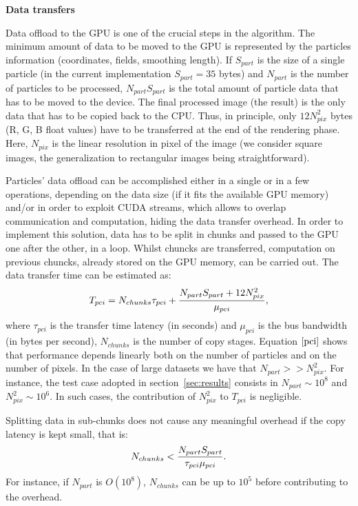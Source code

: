 \documentclass[11pt]{article}
\begin{document}
\medskip
\noindent
{\bf Data transfers}

Data offload to the GPU is one of the crucial steps in the algorithm. 
The minimum amount of data 
to be moved to the GPU is represented by the particles information 
(coordinates, fields, smoothing length). If $S_{part}$ is the
size of a single particle (in the current implementation $S_{part}=35$ bytes) and 
$N_{part}$ is the number of particles to be processed,
$N_{part} S_{part}$ is the total amount of particle data that has to be moved to the device.
The final processed image (the result) is the only data that has to be copied back to
the CPU. Thus, in principle, only $12 N_{pix}^2$ bytes (R, G, B float values) have to be transferred at
the end of the rendering phase. Here, $N_{pix}$ is the linear resolution in pixel of the 
image (we consider square images, the generalization to rectangular images being
straightforward). 

Particles' data offload can be accomplished either in a single or in a few operations, 
depending on the data size (if it fits the available GPU memory) and/or
in order to exploit CUDA streams, which allows to overlap communication 
and computation, hiding the data transfer overhead.  
In order to implement this solution, data has to be
split in chunks and passed to the GPU one after the other, in a loop. Whilst chuncks 
are transferred, computation on previous chuncks, already stored on the GPU
memory, can be carried out. 
The data transfer time can be estimated as:
\begin{equation}\label{pci}
T_{pci} =  N_{chunks} \tau_{pci} + {N_{part} S_{part} + 12 N_{pix}^2 \over 
\mu_{pci}},
\end{equation}
where $\tau_{pci}$ is the transfer time latency (in seconds) and $\mu_{pci}$ is the
bus bandwidth (in bytes per second), $N_{chunks}$ is the number 
of copy stages. 
Equation $\eqref{pci}$ shows that performance
depends linearly both on the number of particles and on the number of pixels.
In the case of large datasets we have that
$N_{part} >> N_{pix}^2$. For instance, the test case adopted
in section~\ref{sec:results} consists in $N_{part} \sim 10^8$
and $N_{pix}^2 \sim 10^6$. In such cases, the contribution of $N_{pix}^2$
to $T_{pci}$ is negligible.

Splitting data in sub-chunks does not
cause any meaningful overhead if the copy latency is kept small, that is:
\begin{equation}
N_{chunks} < {N_{part} S_{part}\over \tau_{pci}\mu_{pci}}.
\end{equation}
For instance, if $N_{part}$ is $O(10^8)$, $N_{chunks}$ can be up to $10^5$ before
contributing to the overhead.
\end{document}
